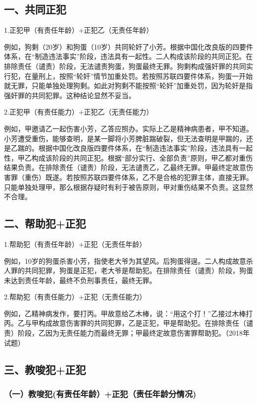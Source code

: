 \subsection*{一、共同正犯}

1.正犯甲（有责任年龄）+正犯乙（无责任年龄）

例如，狗剩（20岁）和狗蛋（10岁）共同轮奸了小芳。根据中国化改良版的四要件体系，在“制造违法事实”阶段，违法具有一起性。二人构成该阶段的共同正犯。在排除责任（谴责）阶段，无法谴责狗蛋，狗蛋最终无罪。狗剩构成强奸罪的共同实行犯，在量刑上，按照“轮奸”情节加重处罚。若按照苏联四要件体系，狗蛋一开始就无罪，只能单独处理狗剩。如此对狗剩不能按照“轮奸”加重处罚，因为轮奸是指强奸罪的共同犯罪。这种结论显然不妥当。

2.正犯甲（有责任能力）+正犯乙（无责任能力）

例如，甲邀请乙一起伤害小芳，乙答应照办。实际上乙是精神病患者，甲不知道。小芳遭受重伤，能够查明，是某一脚将小芳脾脏踹破裂，但无法查明是甲踹的，还是乙踹的。根据中国化改良版四要件体系，在“制造违法事实”阶段，违法具有一起性，甲乙构成该阶段的共同正犯。根据“部分实行、全部负责”原则，甲乙都对重伤结果负责。在排除责任（谴责）阶段，无法谴责乙，乙最终无罪。甲最终定故意伤害罪（重伤）既遂。若按照苏联四要件体系，乙不是合格的犯罪主体，直接无罪。只能单独处理甲，那么根据存疑时有利于被告原则，甲对重伤结果不负责。这显然不合理。

\subsection*{二、帮助犯+正犯}

1.帮助犯（有责任年龄）+正犯（无责任年龄）

例如，10岁的狗蛋杀害小芳，指使老大爷为其望风。后狗蛋得逞。二人构成故意杀人罪的共同犯罪，狗蛋是正犯，老大爷是帮助犯。在排除责任（谴责）阶段，狗蛋未达到责任年龄，最终不负刑事责任，最终无罪。

2.帮助犯（有责任能力）+正犯（无责任能力）

例如，乙精神病发作，要打丙。甲故意给乙木棒，说：“用这个打！”乙接过木棒打丙。乙与甲构成故意伤害罪的共同犯罪，乙是正犯，甲是帮助犯。在排除责任（谴责）阶段，乙因为无责任能力而最终无罪；甲最终定故意伤害罪帮助犯。（2018年试题）

\subsection*{三、教唆犯+正犯}

\subsubsection*{（一）教唆犯(有责任年龄）+正犯（责任年龄分情况)}

